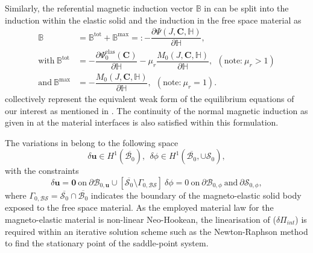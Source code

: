\documentclass[11pt,a4paper,final]{article}
\begin{document}
Similarly, the referential magnetic induction vector $\mathbb{B}$ in  can be split into the induction within the elastic solid and the induction in the free space material as
\begin{align}
\mathbb{B} &= \mathbb{B}^{\text{tot}} + \mathbb{B}^{\text{max}} =: -\dfrac{\partial \Psi (J, \mathbf{C}, \mathbb{H})}{\partial \mathbb{H}}, \\
\text{with} \ \mathbb{B}^{\text{tot}} &= -\dfrac{\partial \Psi_0^{\text{elas}} (\mathbf{C})}{\partial \mathbb{H}} - \mu_r \dfrac{M_0 (J, \mathbf{C}, \mathbb{H})}{\partial \mathbb{H}}, \ \ (\text{note:} \ \mu_r > 1)\\
\text{and} \ \mathbb{B}^{\text{max}} &= -\dfrac{M_0 (J, \mathbf{C}, \mathbb{H})}{\partial \mathbb{H}}, \ \ (\text{note:} \ \mu_r = 1).
\end{align}
 collectively represent the equivalent weak form of the equilibrium equations of our interest as mentioned in . The continuity of the normal magnetic induction as given in  at the material interfaces is also satisfied within this formulation. \par 

\noindent The variations in  belong to the following space
\begin{equation}
\delta \mathbf{u} \in H^1 (\overline{\mathcal{B}_0}), \ \ \delta \phi \in H^1 (\overline{\mathcal{B}_0}, \cup \mathcal{S}_0),
\end{equation}
with the constraints 
\begin{equation}
\delta \mathbf{u} = \mathbf{0} \ \text{on} \ \partial \mathcal{B}_{0,\mathbf{u}} \cup \left[ \overline{\mathcal{S}_0} \setminus \Gamma_{0, \mathcal{BS}} \right] \ \delta \phi = 0 \ \text{on} \ \partial \mathcal{B}_{0,\phi} \ \text{and} \ \partial \mathcal{S}_{0,\phi},
\end{equation}
where $\Gamma_{0, \mathcal{BS}} = \overline{\mathcal{S}_0} \cap \overline{\mathcal{B}_0}$ indicates the boundary of the magneto-elastic solid body exposed to the free space material. As the employed material law for the magneto-elastic material is non-linear Neo-Hookean, the linearisation of  ($\delta \Pi_{int}$) is required within an iterative solution scheme such as the Newton-Raphson method to find the stationary point of the saddle-point system. 
\end{document}
